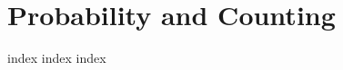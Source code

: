 \chapter{Probability and Counting}
\label{ch:pac}
\ifdefined\HCode
\else
{
\startcontents[chapter]
}
\fi

{index}
{index}
{index}

\ifdefined\HCode
{}
\fi

\ifdefined\HCode
\else
{
\stopcontents[chapter]
}
\fi